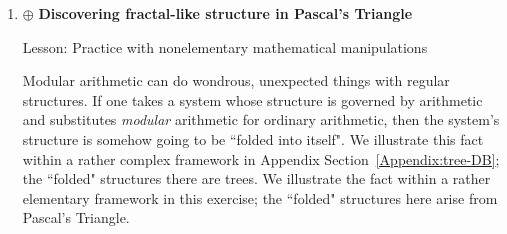 \begin{enumerate}
\medskip\item
$\oplus$
{\bf Discovering fractal-like structure in Pascal's Triangle}

{\sc Lesson:} Practice with nonelementary mathematical manipulations

\smallskip


Modular arithmetic can do wondrous, unexpected things with regular structures.  If one takes a system whose structure is governed by arithmetic and substitutes {\em modular} arithmetic for ordinary arithmetic, then the system's structure is somehow going to be ``folded into itself".  We illustrate this fact within a rather complex framework in Appendix 
Section~\ref{Appendix:tree-DB}; the ``folded" structures there are trees.  We illustrate the fact within a rather elementary framework in this exercise; the ``folded" structures here arise from Pascal's Triangle.

\medskip


\end{enumerate}
